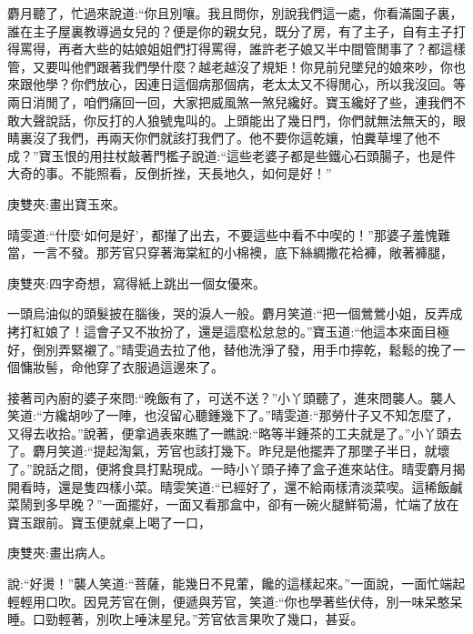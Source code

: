 \begin{parag}
麝月聽了，忙過來說道:“你且別嚷。我且問你，別說我們這一處，你看滿園子裏，誰在主子屋裏教導過女兒的？便是你的親女兒，既分了房，有了主子，自有主子打得罵得，再者大些的姑娘姐姐們打得罵得，誰許老子娘又半中間管閒事了？都這樣管，又要叫他們跟著我們學什麼？越老越沒了規矩！你見前兒墜兒的娘來吵，你也來跟他學？你們放心，因連日這個病那個病，老太太又不得閒心，所以我沒回。等兩日消閒了，咱們痛回一回，大家把威風煞一煞兒纔好。寶玉纔好了些，連我們不敢大聲說話，你反打的人狼號鬼叫的。上頭能出了幾日門，你們就無法無天的，眼睛裏沒了我們，再兩天你們就該打我們了。他不要你這乾孃，怕糞草埋了他不成？”寶玉恨的用拄杖敲著門檻子說道:“這些老婆子都是些鐵心石頭腸子，也是件大奇的事。不能照看，反倒折挫，天長地久，如何是好！”\begin{note}庚雙夾:畫出寶玉來。\end{note}晴雯道:“什麼‘如何是好’，都攆了出去，不要這些中看不中喫的！”那婆子羞愧難當，一言不發。那芳官只穿著海棠紅的小棉襖，底下絲綢撒花袷褲，敞著褲腿，\begin{note}庚雙夾:四字奇想，寫得紙上跳出一個女優來。\end{note}一頭烏油似的頭髮披在腦後，哭的淚人一般。麝月笑道:“把一個鶯鶯小姐，反弄成拷打紅娘了！這會子又不妝扮了，還是這麼松怠怠的。”寶玉道:“他這本來面目極好，倒別弄緊襯了。”晴雯過去拉了他，替他洗淨了發，用手巾擰乾，鬆鬆的挽了一個慵妝髻，命他穿了衣服過這邊來了。
\end{parag}


\begin{parag}
    接著司內廚的婆子來問:“晚飯有了，可送不送？”小丫頭聽了，進來問襲人。襲人笑道:“方纔胡吵了一陣，也沒留心聽鍾幾下了。”晴雯道:“那勞什子又不知怎麼了，又得去收拾。”說著，便拿過表來瞧了一瞧說:“略等半鍾茶的工夫就是了。”小丫頭去了。麝月笑道:“提起淘氣，芳官也該打幾下。昨兒是他擺弄了那墜子半日，就壞了。”說話之間，便將食具打點現成。一時小丫頭子捧了盒子進來站住。晴雯麝月揭開看時，還是隻四樣小菜。晴雯笑道:“已經好了，還不給兩樣清淡菜喫。這稀飯鹹菜鬧到多早晚？”一面擺好，一面又看那盒中，卻有一碗火腿鮮筍湯，忙端了放在寶玉跟前。寶玉便就桌上喝了一口，\begin{note}庚雙夾:畫出病人。\end{note}說:“好燙！”襲人笑道:“菩薩，能幾日不見葷，饞的這樣起來。”一面說，一面忙端起輕輕用口吹。因見芳官在側，便遞與芳官，笑道:“你也學著些伏侍，別一味呆憨呆睡。口勁輕著，別吹上唾沫星兒。”芳官依言果吹了幾口，甚妥。
\end{parag}


